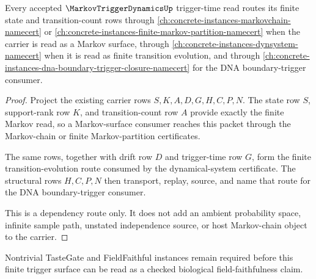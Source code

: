 

\begin{theorem}
\label{thm:markov-trigger-dynamics-sibling-dependency-route}
Every accepted $\MarkovTriggerDynamicsUp$ trigger-time read routes its finite state and transition-count rows through \autoref{ch:concrete-instances-markovchain-namecert} or \autoref{ch:concrete-instances-finite-markov-partition-namecert} when the carrier is read as a Markov surface, through \autoref{ch:concrete-instances-dynsystem-namecert} when it is read as finite transition evolution, and through \autoref{ch:concrete-instances-dna-boundary-trigger-closure-namecert} for the DNA boundary-trigger consumer.
\end{theorem}
\begin{proof}
Project the existing carrier rows $S,K,A,D,G,H,C,P,N$. The state row $S$, support-rank row $K$, and transition-count row $A$ provide exactly the finite Markov read, so a Markov-surface consumer reaches this packet through the Markov-chain or finite Markov-partition certificates.

The same rows, together with drift row $D$ and trigger-time row $G$, form the finite transition-evolution route consumed by the dynamical-system certificate. The structural rows $H,C,P,N$ then transport, replay, source, and name that route for the DNA boundary-trigger consumer.

This is a dependency route only. It does not add an ambient probability space, infinite sample path, unstated independence source, or host Markov-chain object to the carrier.
\end{proof}

Nontrivial TasteGate and FieldFaithful instances remain required before this finite trigger surface can be read as a checked biological field-faithfulness claim.



